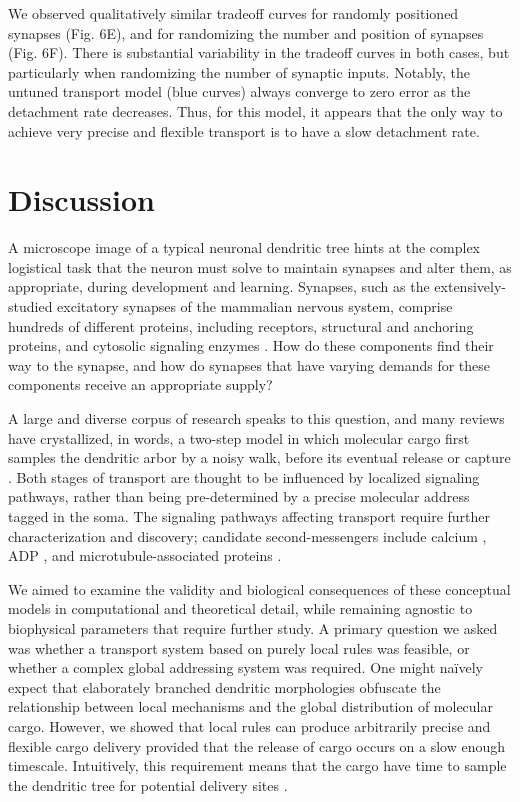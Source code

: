 \documentclass[11pt]{wlpeerj}
\begin{document}
We observed qualitatively similar tradeoff curves for randomly positioned synapses (Fig. 6E), and for randomizing the number and position of synapses (Fig. 6F). There is substantial variability in the tradeoff curves in both cases, but particularly when randomizing the number of synaptic inputs. Notably, the untuned transport model (blue curves) always converge to zero error as the detachment rate decreases. Thus, for this model, it appears that the only way to achieve very precise and flexible transport is to have a slow detachment rate.

\section*{Discussion}

A microscope image of a typical neuronal dendritic tree hints at the complex logistical task that the neuron must solve to maintain synapses and alter them, as appropriate, during development and learning.
Synapses, such as the extensively-studied excitatory synapses of the mammalian nervous system, comprise hundreds of different proteins, including receptors, structural and anchoring proteins, and cytosolic signaling enzymes \citep{Liu2014,Lassek2015}.
How do these components find their way to the synapse, and how do synapses that have varying demands for these components receive an appropriate supply?

A large and diverse corpus of research speaks to this question, and many reviews have crystallized, in words, a two-step model in which molecular cargo first samples the dendritic arbor by a noisy walk, before its eventual release or capture \citep{Welte2004,Doyle_2011,Buxbaum_2014b,Buxbaum2015}.
Both stages of transport are thought to be influenced by localized signaling pathways, rather than being pre-determined by a precise molecular address tagged in the soma.
The signaling pathways affecting transport require further characterization and discovery; candidate second-messengers include calcium \citep{Wang_2009}, ADP \citep{Mironov_2007}, and microtubule-associated proteins \citep{Soundararajan_2014}.

We aimed to examine the validity and biological consequences of these conceptual models in computational and theoretical detail, while remaining agnostic to biophysical parameters that require further study.
A primary question we asked was whether a transport system based on purely local rules was feasible, or whether a complex global addressing system was required.
One might na\"ively expect that elaborately branched dendritic morphologies obfuscate the relationship between local mechanisms and the global distribution of molecular cargo.
However, we showed that local rules can produce arbitrarily precise and flexible cargo delivery provided that the release of cargo occurs on a slow enough timescale.
Intuitively, this requirement means that the cargo have time to sample the dendritic tree for potential delivery sites \citep{Welte2004}.
\end{document}

